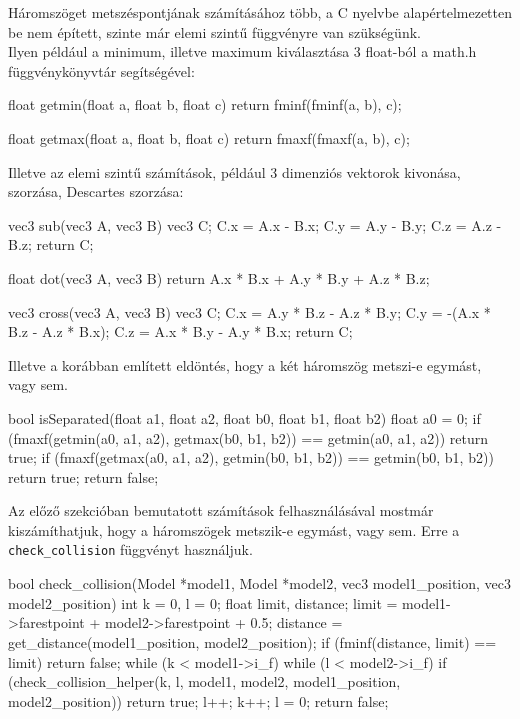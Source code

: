 Háromszöget metszéspontjának számításához több, a C nyelvbe alapértelmezetten be nem épített, szinte már elemi szintű függvényre van szükségünk. \\
Ilyen például a minimum, illetve maximum kiválasztása 3 float-ból a math.h függvénykönyvtár segítségével:

\begin{cpp}
float getmin(float a, float b, float c)
{
    return fminf(fminf(a, b), c);
}

float getmax(float a, float b, float c)
{
    return fmaxf(fmaxf(a, b), c);
}
\end{cpp}
Illetve az elemi szintű számítások, például 3 dimenziós vektorok kivonása, szorzása, Descartes szorzása:

\begin{cpp}
vec3 sub(vec3 A, vec3 B)
{
    vec3 C;
    C.x = A.x - B.x;
    C.y = A.y - B.y;
    C.z = A.z - B.z;
    return C;
}
	
float dot(vec3 A, vec3 B)
{
    return A.x * B.x + A.y * B.y + A.z * B.z;
}
\end{cpp}
\newpage
\begin{cpp}
vec3 cross(vec3 A, vec3 B)
{
    vec3 C;
    C.x = A.y * B.z - A.z * B.y;
    C.y = -(A.x * B.z - A.z * B.x);
    C.z = A.x * B.y - A.y * B.x;
    return C;
}
\end{cpp}
Illetve a korábban említett eldöntés, hogy a két háromszög metszi-e egymást, vagy sem.

\begin{cpp}
bool isSeparated(float a1, float a2, float b0, float b1, float b2)
{
    float a0 = 0;
    if (fmaxf(getmin(a0, a1, a2), getmax(b0, b1, b2)) 
    == getmin(a0, a1, a2))
    {
        return true;
    }
    if (fmaxf(getmax(a0, a1, a2), getmin(b0, b1, b2)) 
    == getmin(b0, b1, b2))
    {
        return true;
    }
    return false;
}
\end{cpp}
\newpage
{}

Az előző szekcióban bemutatott számítások felhasználásával mostmár kiszámíthatjuk, hogy a háromszögek metszik-e egymást, vagy sem. Erre a \texttt{check\_collision} függvényt használjuk.

\begin{cpp}
bool check_collision(Model *model1, Model *model2, vec3 model1_position,
vec3 model2_position)
{
    int k = 0, l = 0;
    float limit, distance;
    limit = model1->farestpoint + model2->farestpoint + 0.5;
    distance = get_distance(model1_position, model2_position);
    if (fminf(distance, limit) == limit)
    {
        return false;
    }
    while (k < model1->i_f)
    {
        while (l < model2->i_f)
        {
            if (check_collision_helper(k, l, model1, model2, 
            model1_position, model2_position))
            {
                return true;
            }
            l++;
        }
        k++;
        l = 0;
    }
    return false;
}
\end{cpp}

